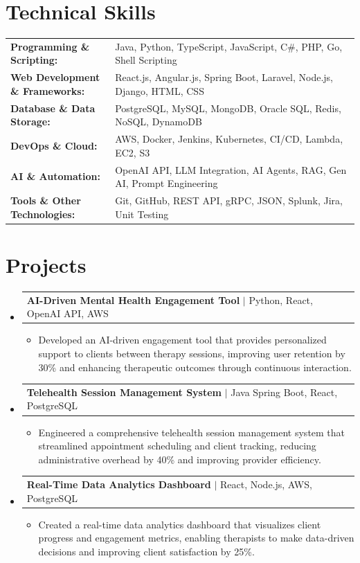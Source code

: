 \documentclass[letterpaper,10pt]{article}
\makeatletter
\newcommand{\resumeItem}[1]{
  \item{\fontsize{8pt}{9pt}\selectfont
    #1 \vspace{-3pt}
  }
}
\newcommand{\resumeProjectHeading}[2]{
    \item
    \begin{tabular*}{1.001\textwidth}{l@{\extracolsep{\fill}}r}
      \fontsize{8.5pt}{10pt}#1 & \textbf{\fontsize{8.5pt}{10pt} #2}\\
    \end{tabular*}\vspace{-7pt}
}
\newcommand{\resumeSubHeadingListStart}{\begin{itemize}[leftmargin=0pt, label={}]}
\newcommand{\resumeSubHeadingListEnd}{\end{itemize}}
\newcommand{\resumeItemListStart}{\begin{itemize}[leftmargin=*]}
\newcommand{\resumeItemListEnd}{\end{itemize}\vspace{-5pt}}
\makeatother
\begin{document}
\section{Technical Skills}
        \vspace{-14pt}
        \begin{table}[h]
            \fontsize{8pt}{9pt}\selectfont
            \begin{tabular}{p{0.3\linewidth} p{0.7\linewidth}}
                \textbf{Programming \& Scripting:} & Java, Python, TypeScript, JavaScript, C\#, PHP, Go, Shell Scripting \\
                \textbf{Web Development \& Frameworks:} & React.js, Angular.js, Spring Boot, Laravel, Node.js, Django, HTML, CSS \\
                \textbf{Database \& Data Storage:} & PostgreSQL, MySQL, MongoDB, Oracle SQL, Redis, NoSQL, DynamoDB \\
                \textbf{DevOps \& Cloud:} & AWS, Docker, Jenkins, Kubernetes, CI/CD, Lambda, EC2, S3 \\
                \textbf{AI \& Automation:} & OpenAI API, LLM Integration, AI Agents, RAG, Gen AI, Prompt Engineering \\
                \textbf{Tools \& Other Technologies:} & Git, GitHub, REST API, gRPC, JSON, Splunk, Jira, Unit Testing \\
            \end{tabular}
        \end{table}
 \vspace{-18pt}

\section{Projects}
    \vspace{-5pt}
    \resumeSubHeadingListStart
          \resumeProjectHeading
            {\textbf{AI-Driven Mental Health Engagement Tool} $|$ Python, React, OpenAI API, AWS}{}
            \resumeItemListStart
                \resumeItem{Developed an AI-driven engagement tool that provides personalized support to clients between therapy sessions, improving user retention by 30\% and enhancing therapeutic outcomes through continuous interaction.}
            \resumeItemListEnd
        \vspace{-12pt}
    
        \resumeProjectHeading
            {\textbf{Telehealth Session Management System} $|$ Java Spring Boot, React, PostgreSQL}{}
        \resumeItemListStart
                \resumeItem{Engineered a comprehensive telehealth session management system that streamlined appointment scheduling and client tracking, reducing administrative overhead by 40\% and improving provider efficiency.}
        \resumeItemListEnd
      \vspace{-12pt}
      \resumeProjectHeading
        {\textbf{Real-Time Data Analytics Dashboard} $|$ React, Node.js, AWS, PostgreSQL}{}
    \resumeItemListStart
            \resumeItem{Created a real-time data analytics dashboard that visualizes client progress and engagement metrics, enabling therapists to make data-driven decisions and improving client satisfaction by 25\%.}
    \resumeItemListEnd
    \resumeSubHeadingListEnd
\end{document}
